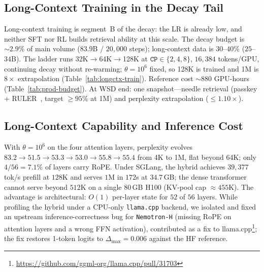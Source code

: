 \subsection{Long-Context Training in the Decay Tail}\label{sec:longctx-train}
Long-context training is segment~B of the decay: the LR is already low, and neither SFT nor RL builds retrieval ability at this scale.
The decay budget is ${\sim}2.9\%$ of main volume ($83.9$B / $20{,}000$ steps); long-context data is $30$--$40\%$ ($25$--$34$B). The ladder runs \mbox{32K$\to$64K$\to$128K} at $\texttt{CP}\in\{2,4,8\}$, $16{,}384$ tokens/GPU, continuing decay without re-warming; $\theta{=}10^{6}$ fixed, so 128K is trained and 1M is $8\times$ extrapolation (Table~\ref{tab:longctx-train}). Reference cost ${\sim}880$ GPU-hours (Table~\ref{tab:prod-budget}).
At WSD end: one snapshot---needle retrieval (passkey + RULER~\cite{hsieh2024ruler}, target ${\geq}95\%$ at 1M) and perplexity extrapolation ($\leq 1.10\times$).

\subsection{Long-Context Capability and Inference Cost}\label{sec:longctx}
With $\theta{=}10^{6}$ on the four attention layers, perplexity evolves $83.2\to51.5\to53.3\to53.0\to55.8\to55.4$ from 4K to 1M, flat beyond 64K; only $4/56{=}7.1\%$ of layers carry RoPE. Under SGLang, the hybrid achieves $39{,}377$ tok/s prefill at $128$K and serves $1$M in $172$s at $34.7$\,GB; the dense transformer cannot serve beyond $512$K on a single $80$\,GB H100 (KV-pool cap ${\approx}455$K). The advantage is architectural: $O(1)$ per-layer state for $52$ of $56$ layers. While profiling the hybrid under a CPU-only \texttt{llama.cpp} backend, we isolated and fixed an upstream inference-correctness bug for \texttt{Nemotron-H} (missing RoPE on attention layers and a wrong FFN activation), contributed as a fix to llama.cpp\footnote{\url{https://github.com/ggml-org/llama.cpp/pull/31703}}; the fix restores 1-token logits to $\Delta_{\mathrm{max}}{=}0.006$ against the HF reference.

